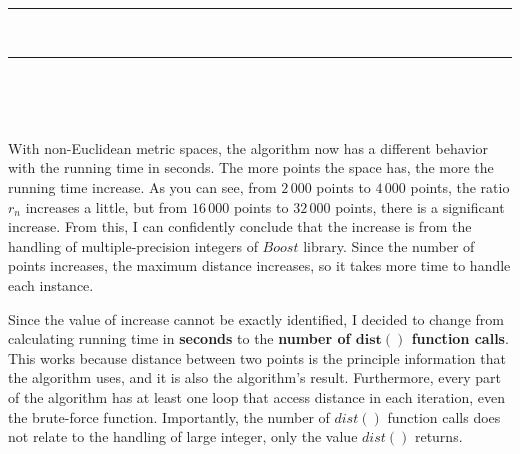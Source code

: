\documentclass[12pt,english,]{article}
\let\origfigure\figure
\let\endorigfigure\endfigure
\renewenvironment{figure}[1][2] {
    \expandafter\origfigure\expandafter[H]
} {
    \endorigfigure
}
\begin{document}
\hrule

~

\begin{figure}
\begin{minipage}{0.95\textwidth}
\begin{center}
\end{center}
\end{minipage}
\caption[Caption]{The graph of ratios $r_n$ versus different values of $n$ of random points on non-Euclidean spaces with $n \in \{2000, 4000, 8000, 16\,000, 32\,000\}$ (with y-scale = $0.5\times10^{-2}$).}
\label{fig:randomgraph}
\end{figure}

\hrule

~

~

With non-Euclidean metric spaces, the algorithm now has a different
behavior with the running time in seconds. The more points the space
has, the more the running time increase. As you can see, from \(2\,000\)
points to \(4\,000\) points, the ratio \(r_n\) increases a little, but
from \(16\,000\) points to \(32\,000\) points, there is a significant
increase. From this, I can confidently conclude that the increase is
from the handling of multiple-precision integers of \(Boost\) library.
Since the number of points increases, the maximum distance increases, so
it takes more time to handle each instance.

Since the value of increase cannot be exactly identified, I decided to
change from calculating running time in \textbf{seconds} to the
\textbf{number of \(\boldsymbol{dist()}\) function calls}. This works
because distance between two points is the principle information that
the algorithm uses, and it is also the algorithm's result. Furthermore,
every part of the algorithm has at least one loop that access distance
in each iteration, even the brute-force function. Importantly, the
number of \(dist()\) function calls does not relate to the handling of
large integer, only the value \(dist()\) returns.
\end{document}
